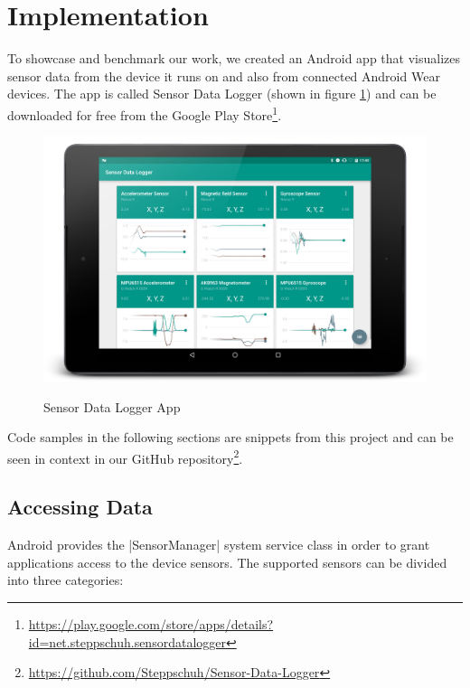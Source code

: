 \section{Implementation}
\label{sec:implementation}

To showcase and benchmark our work, we created an Android app that visualizes sensor data from the device it runs on and also from connected Android Wear devices.
The app is called Sensor Data Logger (shown in figure \ref{fig:sensorDataLoggerApp}) and can be downloaded for free from the Google Play Store\footnote{\href{https://play.google.com/store/apps/details?id=net.steppschuh.sensordatalogger}{https://play.google.com/store/apps/details?id=net.steppschuh.sensordatalogger}}.

\begin{figure}[H]
	\href{https://github.com/Steppschuh/Sensor-Data-Logger}{
		\includegraphics[width=\linewidth]{images/app/charts_landscape_framed.png}
	}
	\caption[Caption for Sensor Data Logger App]{Sensor Data Logger App}
	\label{fig:sensorDataLoggerApp}
\end{figure}

Code samples in the following sections are snippets from this project and can be seen in context in our GitHub repository\footnote{\href{https://github.com/Steppschuh/Sensor-Data-Logger}{https://github.com/Steppschuh/Sensor-Data-Logger}}.

\clearpage

\subsection{Accessing Data}
\label{sec:implementation:accessingdata}

Android provides the |SensorManager|\cite{androiddocs:sensormanager} system service class in order to grant applications access to the device sensors.
The supported sensors can be divided into three categories:

